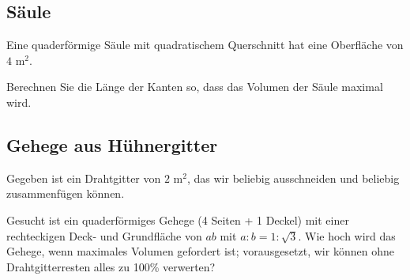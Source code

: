 



\subsection{Säule}

Eine quaderförmige Säule mit quadratischem Querschnitt hat eine Oberfläche von $4 \text{ m}^2$.

Berechnen Sie die Länge der Kanten so, dass das Volumen der Säule
maximal wird.

\subsection{Gehege aus Hühnergitter}

 Gegeben ist ein Drahtgitter von $2 \text{ m}^2$, das wir beliebig ausschneiden
    und beliebig zusammenfügen können.
    
    Gesucht ist ein quaderförmiges Gehege (4 Seiten + 1 Deckel) mit einer 
    rechteckigen Deck- und Grundfläche von $ab$ mit $a:b = 1:\sqrt{3}$.
    Wie hoch wird das Gehege, wenn maximales Volumen gefordert ist;
    vorausgesetzt, wir können ohne Drahtgitterresten alles zu 100\%
    verwerten?


